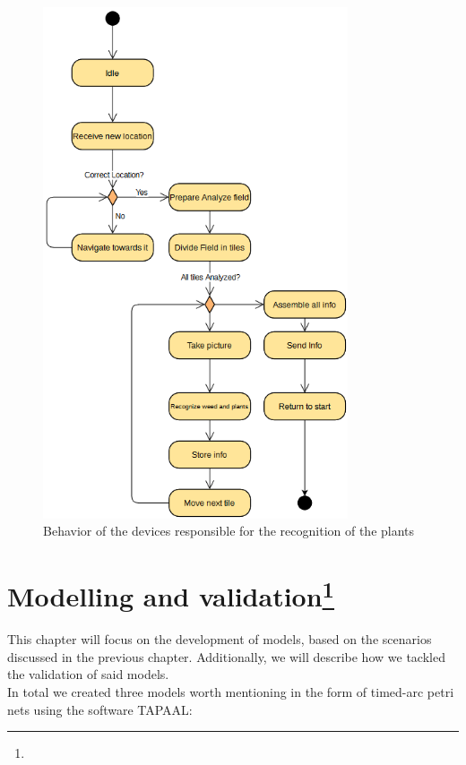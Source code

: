 \documentclass[english]{lni}
\begin{document}
\begin{figure}[H]
    \centering
    \includegraphics[width = 9cm]{img/sentinel_activity.PNG}
    \caption{Behavior of the devices responsible for the recognition of the plants}
    \label{fig:sentinels_activity}
\end{figure}



\newpage

\section[Modeling and validation]{Modelling and validation\protect\footnote{}}\label{sec:model_vali}
This chapter will focus on the development of models, based on the scenarios discussed in the previous chapter. Additionally, we will describe how we tackled the validation of said models.\\
In total we created three models worth mentioning in the form of timed-arc petri nets using the software TAPAAL: \cite{DJJJMS:TACAS:12}
\end{document}
